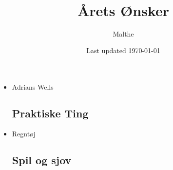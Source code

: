 \documentclass{article}
\title{Årets Ønsker}
\author{Malthe}
\date{Last updated \today}
\begin{document}
\maketitle


\begin{itemize}
\subsection{Bøger}
    \item  Adrians Wells
\subsection{Praktiske Ting}
    \item Regntøj
  
\subsection{Spil og sjov}
\end{itemize}
\end{document}
